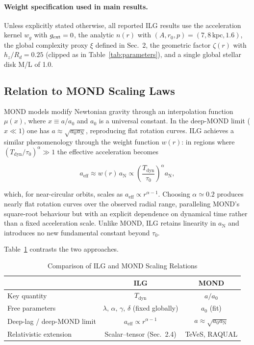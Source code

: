\documentclass[12pt,a4paper]{article}
\begin{document}
\paragraph{Weight specification used in main results.} Unless explicitly stated otherwise, all reported ILG results use the acceleration kernel $w_g$ with $g_{\rm ext}=0$, the analytic $n(r)$ with $(A,r_0,p)=(7,8\,\mathrm{kpc},1.6)$, the global complexity proxy $\xi$ defined in Sec.~2, the geometric factor $\zeta(r)$ with $h_z/R_d=0.25$ (clipped as in Table~\ref{tab:parameters}), and a single global stellar disk M/L of 1.0.

\subsection{Relation to MOND Scaling Laws}

MOND models modify Newtonian gravity through an interpolation function $\mu(x)$, where $x \equiv a/a_0$ and $a_0$ is a universal constant.  In the deep-MOND limit ($x \ll 1$) one has $a \approx \sqrt{a_0 a_\mathrm{N}}$, reproducing flat rotation curves.  ILG achieves a similar phenomenology through the weight function $w(r)$: in regions where $(T_\mathrm{dyn}/\tau_0)^\alpha \gg 1$ the effective acceleration becomes

\begin{equation}
a_\mathrm{eff} \approx w(r) \, a_\mathrm{N} \propto \left(\frac{T_\mathrm{dyn}}{\tau_0}\right)^\alpha a_\mathrm{N},
\end{equation}

which, for near-circular orbits, scales as $a_\mathrm{eff} \propto r^{\alpha-1}$.  Choosing $\alpha \simeq 0.2$ produces nearly flat rotation curves over the observed radial range, paralleling MOND's square-root behaviour but with an explicit dependence on dynamical time rather than a fixed acceleration scale.  Unlike MOND, ILG retains linearity in $a_\mathrm{N}$ and introduces no new fundamental constant beyond $\tau_0$.

Table~\ref{tab:mond_compare} contrasts the two approaches.

\begin{table}[h]
\centering
\caption{Comparison of ILG and MOND Scaling Relations}
\label{tab:mond_compare}
\begin{tabular}{l c c}
\toprule
 & ILG & MOND \\
\midrule
Key quantity & $T_\mathrm{dyn}$ & $a/a_0$ \\
Free parameters & $\lambda,\,\alpha,\,\gamma,\,\delta$ (fixed globally) & $a_0$ (fit) \\
Deep-lag / deep-MOND limit & $a_\mathrm{eff} \propto r^{\alpha-1}$ & $a \approx \sqrt{a_0 a_\mathrm{N}}$ \\
Relativistic extension & Scalar–tensor (Sec.~2.4) & TeVeS, RAQUAL \\
\bottomrule
\end{tabular}
\end{table}
\end{document}
